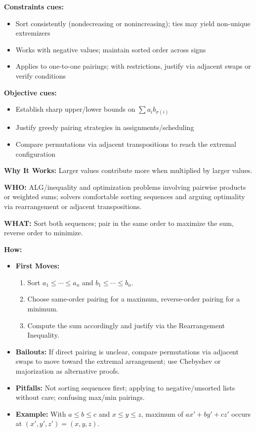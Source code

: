 \documentclass[12pt]{article}
\begin{document}
\textbf{Constraints cues:}
\begin{itemize}
    \item Sort consistently (nondecreasing or nonincreasing); ties may yield non-unique extremizers
    \item Works with negative values; maintain sorted order across signs
    \item Applies to one-to-one pairings; with restrictions, justify via adjacent swaps or verify conditions
\end{itemize}

\textbf{Objective cues:}
\begin{itemize}
    \item Establish sharp upper/lower bounds on $\sum a_i b_{\sigma(i)}$
    \item Justify greedy pairing strategies in assignments/scheduling
    \item Compare permutations via adjacent transpositions to reach the extremal configuration
\end{itemize}

\textbf{Why It Works:} Larger values contribute more when multiplied by larger values.

\textbf{WHO:} ALG/inequality and optimization problems involving pairwise products or weighted sums; solvers comfortable sorting sequences and arguing optimality via rearrangement or adjacent transpositions.

\textbf{WHAT:} Sort both sequences; pair in the same order to maximize the sum, reverse order to minimize.


\textbf{How:}
\begin{itemize}
    \item \textbf{First Moves:}
    \begin{enumerate}[nosep]
        \item Sort $a_1\le \cdots \le a_n$ and $b_1\le \cdots \le b_n$.
        \item Choose same-order pairing for a maximum, reverse-order pairing for a minimum.
        \item Compute the sum accordingly and justify via the Rearrangement Inequality.
    \end{enumerate}
    \item \textbf{Bailouts:} If direct pairing is unclear, compare permutations via adjacent swaps to move toward the extremal arrangement; use Chebyshev or majorization as alternative proofs.
    \item \textbf{Pitfalls:} Not sorting sequences first; applying to negative/unsorted lists without care; confusing max/min pairings.
    \item \textbf{Example:} With $a\le b\le c$ and $x\le y\le z$, maximum of $ax'+by'+cz'$ occurs at $(x',y',z')=(x,y,z)$.
\end{itemize}
\end{document}
